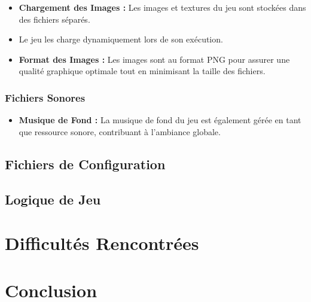 \documentclass{article}
\begin{document}
    \begin{itemize}
        \item \textbf{Chargement des Images :} Les images et textures du jeu sont stockées dans des fichiers séparés.

        \item Le jeu les charge dynamiquement lors de son exécution.

        \item \textbf{Format des Images :} Les images sont au format PNG pour assurer une qualité graphique optimale tout en minimisant la taille des fichiers.
    \end{itemize}

    \subsubsection*{Fichiers Sonores}

    \begin{itemize}
        \item \textbf{Musique de Fond :} La musique de fond du jeu est également gérée en tant que ressource sonore, contribuant à l'ambiance globale.
    \end{itemize}

    \subsection{Fichiers de Configuration}\label{subsec:fichiers-de-configuration}


    \subsection{Logique de Jeu}\label{subsec:logique-de-jeu}


    \section{Difficultés Rencontrées}\label{sec:difficultes-rencontrees}
    \newpage
    \section{Conclusion}\label{sec:conclusion}
\end{document}
